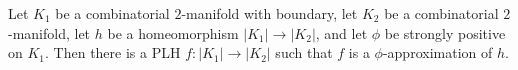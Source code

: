 Let $K_1$ be a combinatorial $2$-manifold with boundary, let $K_2$ be a combinatorial $2$-manifold, let $h$ be a homeomorphism $|K_1| \to |K_2|$, and let $\phi$ be strongly positive on $K_1$. Then there is a PLH $f: |K_1| \to |K_2|$ such that $f$ is a $\phi$-approximation of $h$.

